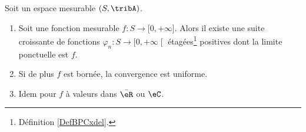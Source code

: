 \begin{theorem}\label{THOooXHIVooKUddLi}
	Soit un espace mesurable \( (S,\tribA)\).
	\begin{enumerate}
		\item
            Soit une fonction mesurable \( f\colon S\to \mathopen[ 0 , +\infty \mathclose]\). Alors il existe une suite croissante de fonctions \( \varphi_n\colon S\to \mathopen[ 0 , +\infty \mathclose[\) étagées\footnote{Définition \ref{DefBPCxdel}.} positives dont la limite ponctuelle est \( f\).
		\item
		      Si de plus \( f\) est bornée, la convergence est uniforme.
		\item
		      Idem pour \( f\) à valeurs dans \( \bar \eR\) ou \( \eC\).
	\end{enumerate}
\end{theorem}

